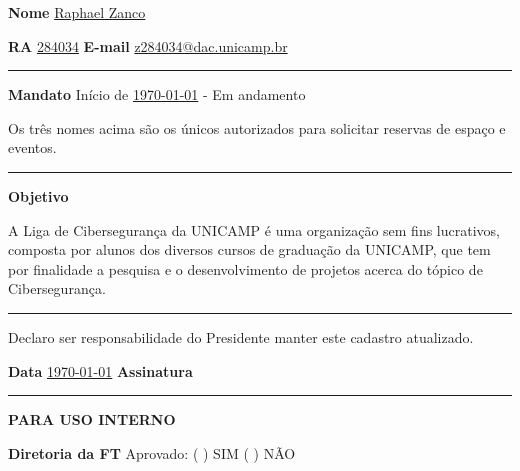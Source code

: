 \documentclass[10pt, a4paper]{article}
\begin{document}
\vspace{0.1cm}

\textbf{Nome} \hspace{1.5cm} \underline{Raphael Zanco}

\vspace{0.3cm}
\textbf{RA} \hspace{0.5cm} \underline{284034}
\hspace{0.5cm}
\textbf{E-mail} \hspace{0.5cm} \underline{z284034@dac.unicamp.br}

\vspace{0.5cm}
\hrule
\vspace{0.5cm}

\textbf{Mandato} Início de \underline{\today}{} - Em andamento

\vspace{0.3cm}
{\scriptsize Os três nomes acima são os únicos autorizados para solicitar reservas de espaço e eventos.}

\vspace{0.5cm}
\hrule
\vspace{0.5cm}

\textbf{Objetivo}

\vspace{0.1cm}
{\footnotesize
    A Liga de Cibersegurança da UNICAMP é uma organização sem fins lucrativos, composta por alunos dos diversos cursos de graduação da UNICAMP, que tem por finalidade a pesquisa e o desenvolvimento de projetos acerca do tópico de Cibersegurança.
}

\vspace{0.5cm}
\hrule
\vspace{0.5cm}

{\footnotesize Declaro ser responsabilidade do Presidente manter este cadastro atualizado.}

\vspace{0.2cm}

\textbf{Data} \hspace{0.5cm} \underline{\today}{}
\hspace{0.3cm}
\textbf{Assinatura}\hspace{0.5cm} \underline{\hspace{3.5cm}}

\begin{center}
    \rule{\textwidth}{1pt}
    \textbf{PARA USO INTERNO}
\end{center}

\vspace{0.3cm}
\textbf{Diretoria da FT} \hspace{1cm} Aprovado: ( \quad ) SIM \hspace{0.5cm} ( \quad ) NÃO
\end{document}
